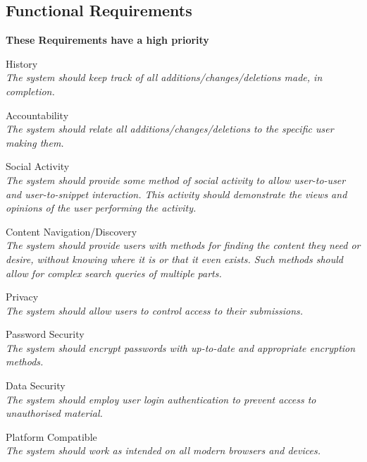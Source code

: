 \subsection{Functional Requirements}
\textbf{These Requirements have a high priority}

\begin{requirements}

    \item History \label{history} \\
	\textit{The system should keep track of all additions/changes/deletions made, in completion.}

    \item Accountability \label{accountability} \\
	\textit{The system should relate all additions/changes/deletions to the specific user making them.}

    \item Social Activity \label{socialactivity} \\
	\textit{The system should provide some method of social activity to allow user-to-user and user-to-snippet interaction. This activity should demonstrate the views and opinions of the user performing the activity.}

    \item Content Navigation/Discovery \label{content} \\
	\textit{The system should provide users with methods for finding the content they need or desire, without knowing where it is or that it even exists. Such methods should allow for complex search queries of multiple parts.}

    \item Privacy \label{privacy} \\
	\textit{The system should allow users to control access to their submissions.}

    \item Password Security \label{passwordsecurity} \\
	\textit{The system should encrypt passwords with up-to-date and appropriate encryption methods.}

    \item Data Security \label{datasecurity} \\
	\textit{The system should employ user login authentication to prevent access to unauthorised material.}

    \item Platform Compatible \label{platformcompatible} \\
	\textit{The system should work as intended on all modern browsers and devices.}

   \end{requirements}

